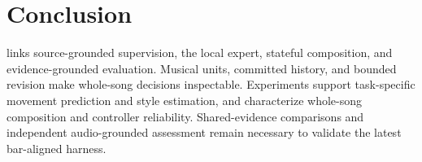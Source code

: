 \section{Conclusion}
\label{sec:conclusion}
\method links source-grounded supervision, the \captioner local expert,
stateful composition, and evidence-grounded evaluation. Musical units,
committed history, and bounded revision make whole-song decisions
inspectable. Experiments support task-specific movement prediction and
style estimation, and characterize whole-song composition and controller
reliability. Shared-evidence comparisons and independent
audio-grounded assessment remain necessary to validate the latest
bar-aligned harness.
